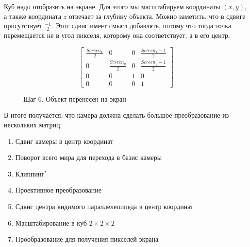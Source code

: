 \documentclass{article}
\begin{document}

Куб надо отобразить на экране. Для этого мы масштабируем координаты $(x, y)$, а также координата $z$ отвечает за глубину объекта. Можно заметить, что в сдвиге присутствует $\frac{-1}{2}$. Этот сдвиг имеет смысл добавлять, потому что тогда точка перемещается не в угол пикселя, которому она соответствует, а в его центр.

$$
\begin{bmatrix}\frac{Screen_x}{2} & 0 & 0 & \frac{Screen_x - 1}{2} \\ 
0 & \frac{Screen_y}{2} & 0 & \frac{Screen_y - 1}{2} \\
0 & 0 & 1 & 0 \\
0 & 0 & 0 & 1\end{bmatrix}
$$


\begin{center}
\begin{figure}[H]
\caption{Шаг 6. Объект перенесен на экран}
\label{ris:image}
\end{figure}
\end{center}



В итоге получается, что камера должна сделать большое преобразование из нескольких матриц:

\begin{enumerate}
	\item Сдвиг камеры в центр координат
	\item Поворот всего мира для перехода в базис камеры
	\item Клиппинг$^*$
	\item Проективное преобразование
	\item Сдвиг центра видимого параллелепипеда в центр координат
	\item Масштабирование в куб $2 \times 2 \times 2$
	\item Прообразование для получения пикселей экрана
\end{enumerate}
\end{document}
